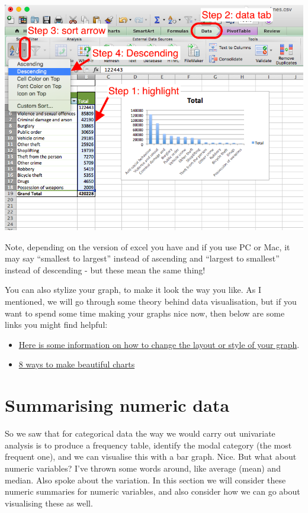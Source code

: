 \documentclass[]{book}
\providecommand{\tightlist}{%
  \setlength{\itemsep}{0pt}\setlength{\parskip}{0pt}}
\theoremstyle{definition}
\theoremstyle{definition}
\theoremstyle{definition}
\theoremstyle{remark}
\begin{document}
\includegraphics{imgs/sort_graph.png}

Note, depending on the version of excel you have and if you use PC or
Mac, it may say ``smallest to largest'' instead of ascending and
``largest to smallest'' instead of descending - but these mean the same
thing!

You can also stylize your graph, to make it look the way you like. As I
mentioned, we will go through some theory behind data visualisation, but
if you want to spend some time making your graphs nice now, then below
are some links you might find helpful:

\begin{itemize}
\tightlist
\item
  \href{https://support.office.com/en-gb/article/Change-the-layout-or-style-of-a-chart-a346e438-d22a-4540-aa87-bce9feb719cf}{Here
  is some information on how to change the layout or style of your
  graph}.
\item
  \href{http://www.upslide.net/blog/ways-to-make-beautiful-financial-charts-and-graphs-in-excel/}{8
  ways to make beautiful charts}
\end{itemize}

\hypertarget{summarising-numeric-data}{%
\section{Summarising numeric data}\label{summarising-numeric-data}}

So we saw that for categorical data the way we would carry out
univariate analysis is to produce a frequency table, identify the modal
category (the most frequent one), and we can visualise this with a bar
graph. Nice. But what about numeric variables? I've thrown some words
around, like average (mean) and median. Also spoke about the variation.
In this section we will consider these numeric summaries for numeric
variables, and also consider how we can go about visualising these as
well.
\end{document}
